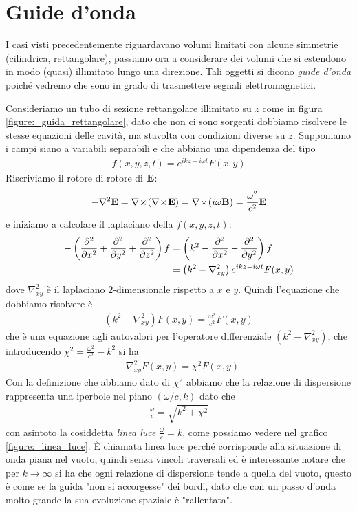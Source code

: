 \section{Guide d'onda}
I casi visti precedentemente riguardavano volumi limitati con alcune simmetrie (cilindrica, rettangolare), passiamo ora a considerare dei volumi che si 
estendono in modo (quasi) illimitato lungo una direzione. Tali oggetti si dicono \textit{guide d'onda} poiché vedremo che sono in grado di trasmettere 
segnali elettromagnetici.

Consideriamo un tubo di sezione rettangolare illimitato su $ z $ come in figura \ref{figure:_guida_rettangolare}, dato che non ci sono sorgenti 
dobbiamo risolvere le stesse equazioni delle cavità, ma stavolta con condizioni diverse su $ z $. Supponiamo i campi siano a variabili separabili 
e che abbiano una dipendenza del tipo
\begin{align}
  f(x,y,z,t) = e^{ikz - i\omega t} F(x,y)
\end{align} 
Riscriviamo il rotore di rotore di $ \v{ E } $:
\begin{align}
  -\nabla^2 \v{ E } = \nabla\!\times\!\left( \nabla\!\times\!\v{ E } \right) = \nabla \! \times \! \left( i \omega \v{ B } \right) 
  =\frac{\omega^2}{c^2} \v{ E } 
\end{align}
e iniziamo a calcolare il laplaciano della $ f(x,y,z,t) $:
\begin{align}
  -\left( \der[2]{}{x} + \der[2]{}{y} + \der[2]{}{z} \right)f &= \left( k^2 - \der[2]{}{x} - \der[2]{}{y} \right) f
  \\
  &= \left( k^2 - \nabla_{xy}^2 \right) e^{ikz - i\omega t} F(x,y)
\end{align}
dove $ \nabla_{xy}^2 $ è il laplaciano $ 2 $-dimensionale rispetto a $ x $ e $ y $. Quindi l'equazione che dobbiamo risolvere è
\begin{align}
  \left( k^2 - \nabla_{xy}^2 \right) F(x,y) = \frac{\omega^2}{c^2} F(x,y)
\end{align}
che è una equazione agli autovalori per l'operatore differenziale $ \left( k^2 - \nabla_{xy}^2 \right) $, che introducendo 
$ \chi^2 = \frac{\omega^2}{c^2} - k^2 $ si ha
\begin{align}
  - \nabla_{xy}^2 F(x,y) = \chi^2 F(x,y)
\end{align}
Con la definizione che abbiamo dato di $ \chi^2 $ abbiamo che la relazione di dispersione rappresenta una iperbole nel piano $ (\omega/c , k) $ dato che
\begin{align}
  \frac{\omega}{c} = \sqrt{k^2 + \chi^2}
\end{align}
con asintoto la cosiddetta \textit{linea luce} $ \frac{\omega}{c} = k $, come possiamo vedere nel grafico \ref{figure:_linea_luce}. È chiamata linea luce 
perché corrisponde alla situazione di onda piana nel vuoto, quindi senza vincoli traversali ed è interessante notare che per $ k \to \infty $ si ha che 
ogni relazione di dispersione tende a quella del vuoto, questo è come se la guida "non si accorgesse" dei bordi, dato che con un passo d'onda molto grande 
la sua evoluzione spaziale è "rallentata". 

